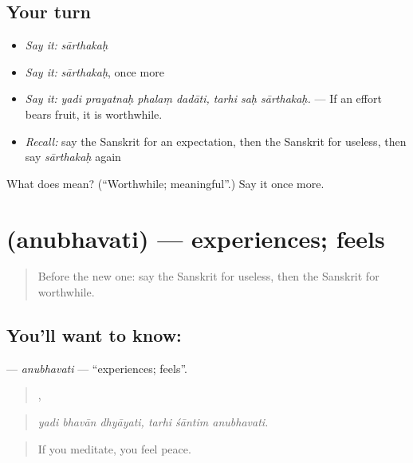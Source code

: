 \subsection*{Your turn}
\begin{itemize}
\raggedright
  \item \emph{Say it:} \emph{sārthakaḥ}
  \item \emph{Say it:} \emph{sārthakaḥ}, once more
  \item \emph{Say it:} \emph{yadi prayatnaḥ phalaṃ dadāti, tarhi saḥ sārthakaḥ.} — If an effort bears fruit, it is worthwhile.
  \item \emph{Recall:} say the Sanskrit for an expectation, then the Sanskrit for useless, then say \emph{sārthakaḥ} again
\end{itemize}

\begin{tcolorbox}[breakable,colback=teal!4,colframe=teal!35!black,title={Before you move on}]
What does  mean? (\textquotedblleft{}Worthwhile; meaningful\textquotedblright{}.) Say it once more.
\end{tcolorbox}
\section[\texorpdfstring{\sk{अनुभवति} (anubhavati)}{अनुभवति (anubhavati)}]{ (anubhavati) — experiences; feels}

\label{lesson:SA-C390-anubhavati}



\begin{quote}
Before the new one: say the Sanskrit for useless, then the Sanskrit for worthwhile.
\end{quote}

\subsection*{You'll want to know: }
\textbf{} — \emph{anubhavati} — \textquotedblleft{}experiences; feels\textquotedblright{}.

\begin{quote}
  ,   
\end{quote}

\begin{quote}
\emph{yadi bhavān dhyāyati, tarhi śāntim anubhavati.}
\end{quote}

\begin{quote}
If you meditate, you feel peace.
\end{quote}

